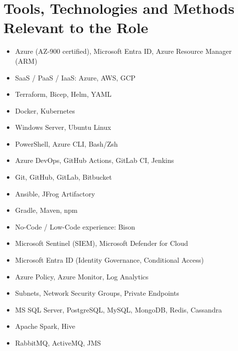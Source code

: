 \section{Tools, Technologies and Methods Relevant to the Role}
\begin{cvcolumns}
        {\begin{itemize}
            \item Azure (AZ-900 certified), Microsoft Entra ID, Azure Resource Manager (ARM)
            \item SaaS / PaaS / IaaS: Azure, AWS, GCP
            \item Terraform, Bicep, Helm, YAML
            \item Docker, Kubernetes
            \item Windows Server, Ubuntu Linux
            \item PowerShell, Azure CLI, Bash/Zsh
        \end{itemize}}
        {\begin{itemize}
            \item Azure DevOps, GitHub Actions, GitLab CI, Jenkins
            \item Git, GitHub, GitLab, Bitbucket
            \item Ansible, JFrog Artifactory
            \item Gradle, Maven, npm
            \item No-Code / Low-Code experience: Bison
        \end{itemize}}
\end{cvcolumns}

\begin{cvcolumns}
        {\begin{itemize}
            \item Microsoft Sentinel (SIEM), Microsoft Defender for Cloud
            \item Microsoft Entra ID (Identity Governance, Conditional Access)
            \item Azure Policy, Azure Monitor, Log Analytics
            \item Subnets, Network Security Groups, Private Endpoints
        \end{itemize}}
        {\begin{itemize}
            \item MS SQL Server, PostgreSQL, MySQL, MongoDB, Redis, Cassandra
            \item Apache Spark, Hive
            \item RabbitMQ, ActiveMQ, JMS
        \end{itemize}}
\end{cvcolumns}


